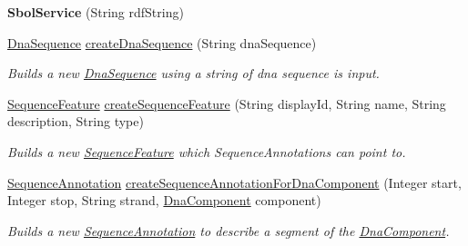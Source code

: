 \begin{DoxyCompactItemize}
\item 
\hypertarget{classorg_1_1sbolstandard_1_1lib_s_b_o_lj_1_1_sbol_service_a33132d6bfbf18e418d1a4e2fe71f01b7}{
{\bfseries SbolService} (String rdfString)}
\label{classorg_1_1sbolstandard_1_1lib_s_b_o_lj_1_1_sbol_service_a33132d6bfbf18e418d1a4e2fe71f01b7}

\item 
\hyperlink{classorg_1_1sbolstandard_1_1lib_s_b_o_lj_1_1_dna_sequence}{DnaSequence} \hyperlink{classorg_1_1sbolstandard_1_1lib_s_b_o_lj_1_1_sbol_service_a61e2cda6134ecedb3a5d0b92206b91a2}{createDnaSequence} (String dnaSequence)
\begin{DoxyCompactList}\small\item\em Builds a new \hyperlink{classorg_1_1sbolstandard_1_1lib_s_b_o_lj_1_1_dna_sequence}{DnaSequence} using a string of dna sequence is input. \item\end{DoxyCompactList}\item 
\hyperlink{classorg_1_1sbolstandard_1_1lib_s_b_o_lj_1_1_sequence_feature}{SequenceFeature} \hyperlink{classorg_1_1sbolstandard_1_1lib_s_b_o_lj_1_1_sbol_service_a5dab616a55f915c1ebaa6b244fb48fb5}{createSequenceFeature} (String displayId, String name, String description, String type)
\begin{DoxyCompactList}\small\item\em Builds a new \hyperlink{classorg_1_1sbolstandard_1_1lib_s_b_o_lj_1_1_sequence_feature}{SequenceFeature} which SequenceAnnotations can point to. \item\end{DoxyCompactList}\item 
\hyperlink{classorg_1_1sbolstandard_1_1lib_s_b_o_lj_1_1_sequence_annotation}{SequenceAnnotation} \hyperlink{classorg_1_1sbolstandard_1_1lib_s_b_o_lj_1_1_sbol_service_ab96b56fff36ffe4e728e749e0dcbef29}{createSequenceAnnotationForDnaComponent} (Integer start, Integer stop, String strand, \hyperlink{classorg_1_1sbolstandard_1_1lib_s_b_o_lj_1_1_dna_component}{DnaComponent} component)
\begin{DoxyCompactList}\small\item\em Builds a new \hyperlink{classorg_1_1sbolstandard_1_1lib_s_b_o_lj_1_1_sequence_annotation}{SequenceAnnotation} to describe a segment of the \hyperlink{classorg_1_1sbolstandard_1_1lib_s_b_o_lj_1_1_dna_component}{DnaComponent}. \item\end{DoxyCompactList}\item 

\end{DoxyCompactItemize}
